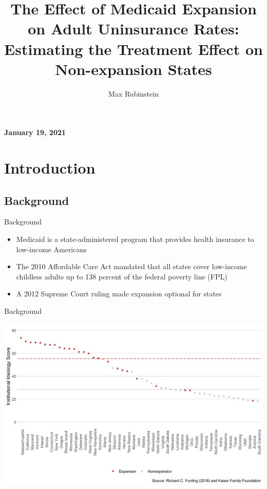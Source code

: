 \documentclass[hyperref={pdfpagelabels=false}]{beamer}
\title{The Effect of Medicaid Expansion on Adult Uninsurance Rates: Estimating the Treatment Effect on Non-expansion States}
\author[shortname]{Max Rubinstein \\}
\institute[]{\and \vspace{-0.26in} \and \vspace{-0.1in}}%
\date{}
\begin{document}

\begin{frame}
\titlepage
\centering 
\vspace{-0.5in}
\textbf{January 19, 2021}
\end{frame} 

\section{Introduction}
\subsection{Background}
\begin{frame}{Background}
\begin{itemize}
    \item Medicaid is a state-administered program that provides health insurance to low-income Americans \bigskip 
    
    \item The 2010 Affordable Care Act mandated that all states cover low-income childless adults up to 138 percent of the federal poverty line (FPL) \bigskip
    
    \item A 2012 Supreme Court ruling made expansion optional for states \bigskip
    
\end{itemize}
\end{frame}

\begin{frame}{Background}
    \begin{center}
	\includegraphics[scale=0.5]{01_Plots/political-expansion-plot.png}
    \end{center}
\end{frame}
\end{document}

